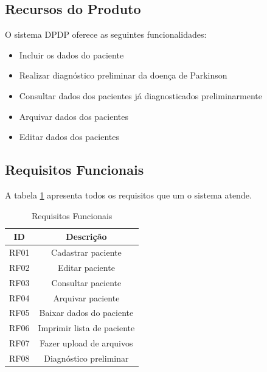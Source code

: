 \begin{anexosenv}
    \subsection{Recursos do Produto}

    O sistema DPDP oferece as seguintes funcionalidades:

    \begin{itemize}
        \item Incluir os dados do paciente
        \item Realizar diagnóstico preliminar da doença de Parkinson
        \item Consultar dados dos pacientes já diagnosticados preliminarmente
        \item Arquivar dados dos pacientes
        \item Editar dados dos pacientes
    \end{itemize}

    \subsection{Requisitos Funcionais}

    A tabela \ref{table:Requisitos Funcionais} apresenta todos os requisitos que um o sistema atende.

    \begin{table}[ht!]
        \centering
        \caption{Requisitos Funcionais}
        \begin{tabular}{@{}|c|c|@{}}
            \hline
            \textbf{ID} & \textbf{Descrição}         \\ \hline
            RF01        & Cadastrar paciente         \\ \hline
            RF02        & Editar paciente            \\ \hline
            RF03        & Consultar paciente         \\ \hline
            RF04        & Arquivar paciente          \\ \hline
            RF05        & Baixar dados do paciente   \\ \hline
            RF06        & Imprimir lista de paciente \\ \hline
            RF07        & Fazer upload de arquivos   \\ \hline
            RF08        & Diagnóstico preliminar     \\ \hline
        \end{tabular}
        \label{table:Requisitos Funcionais}
    \end{table}


\end{anexosenv}